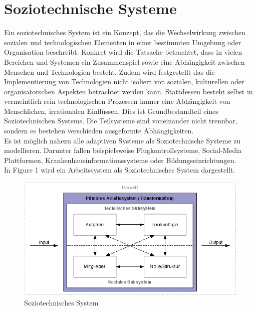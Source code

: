 \documentclass[journal=tosc,final]{iacrtrans}
\begin{document}
\section{Soziotechnische Systeme}
Ein soziotechnisches System ist ein Konzept, das die Wechselwirkung zwischen sozialen und technologischen Elementen in einer bestimmten Umgebung oder Organisation beschreibt. Konkret wird die Tatsache betrachtet, dass in vielen Bereichen und Systemen ein Zusammenspiel sowie eine Abhängigkeit zwischen Menschen und Technologien besteht. Zudem wird festgestellt das die Implementierung von Technologien nicht isoliert von sozialen, kulturellen oder organisatorschen Aspekten betrachtet werden kann. Stattdessen besteht selbst in vermeintlich rein technologischen Prozessen immer eine Abhängigkeit von Menschlichen, irrationalen Einflüssen. Dies ist Grundbestandteil eines Soziotechnischen Systems. Die Teilsysteme sind voneinander nicht trennbar, sondern es bestehen verschieden ausgeformte Abhängigkeiten.\\
Es ist möglich nahezu alle adaptiven Systeme als Soziotechnische Systeme zu modellieren. Darunter fallen beispielsweise Flugkontrollsysteme, Social-Media Plattformen, Krankenhausinformationssysteme oder Bildungseinrichtungen.\\
In Figure 1 wird ein Arbeitssystem als Soziotechnisches System dargestellt.
\begin{figure}[h]
\caption{Soziotechnisches System}
\begin{center}
 \includegraphics[scale=0.5]{sozio.png}
\end{center}
\end{figure}
\end{document}
